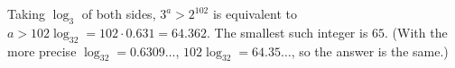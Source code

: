 Taking $\log_3$ of both sides, $3^a>2^{102}$ is equivalent to $a>102\log_32=102\cdot0.631=64.362$. The smallest such integer is $\boxed{65}$. (With the more precise $\log_32=0.6309\ldots$, $102\log_32=64.35\ldots$, so the answer is the same.)
